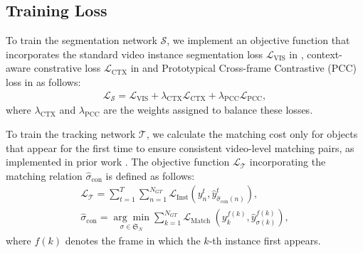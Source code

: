 \documentclass[10pt,twocolumn,letterpaper]{article}
\begin{document}
\subsection{Training Loss}
\label{sec:training}
To train the segmentation network $\mathcal{S}$, we implement an objective function that incorporates the standard video instance segmentation loss $\mathcal{L}_{\text{VIS}}$ in , context-aware constrative loss $\mathcal{L}_{\text{CTX}}$ in  and Prototypical Cross-frame Contrastive (PCC) loss in  as follows:
\begin{equation}
\begin{gathered}
\mathcal{L}_{\mathcal{S}}=\mathcal{L}_{\text{VIS}} + 
\lambda_{\text {CTX}} \mathcal{L}_{\text {CTX}}  +
\lambda_{\text {PCC}} \mathcal{L}_{\text {PCC}}, 
\end{gathered}
\end{equation}
where $\lambda_{\text {CTX}}$ and $\lambda_{\text {PCC}}$ are the weights assigned to balance these losses.



To train the tracking network $\mathcal{T}$, we calculate the matching cost only for objects that appear for the first time to ensure consistent video-level matching pairs, as implemented in prior work \citep{DVIS}.
The objective function $\mathcal{L}_{\mathcal{T}}$ incorporating the matching relation $\hat{\sigma}_{\text{con}}$ is defined as follows:
\begin{equation}
\begin{gathered}
\mathcal{L}_{\mathcal{T}}=\sum_{t=1}^{T} \sum_{n=1}^{N_{GT}} \mathcal{L}_{\text{Inst}} \left( y^{t}_{n}, \hat{y}^{t}_{\hat{\sigma}_{\text{con}}(n)} \right), \\
\hat{\sigma}_{\text{con}}= \underset{\sigma \in \mathfrak{S}_{N}}{\arg \min } \sum_{k=1}^{N_{GT}} \mathcal{L}_{\text {Match }}\left(y_{k}^{f(k)}, \hat{y}_{\sigma(k)}^{f(k)}\right),
\end{gathered}
\end{equation}
where $f(k)$ denotes the frame in which the $k$-th instance first appears.
\end{document}
